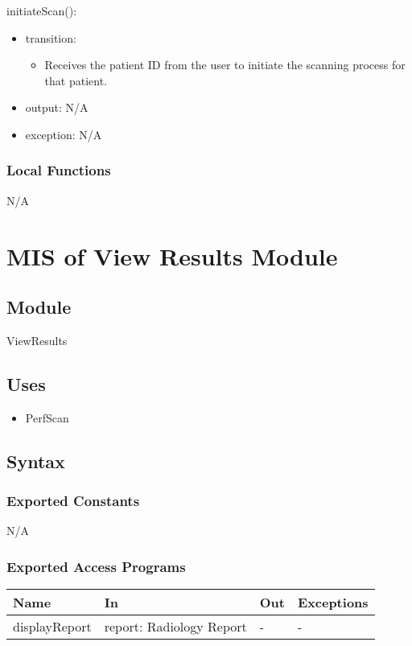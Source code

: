 \documentclass[12pt, titlepage]{article}
\begin{document}
\noindent initiateScan():
\begin{itemize}
\item transition: \begin{itemize}
    \item Receives the patient ID from the user to initiate the scanning process for that patient.
\end{itemize}
\item output: N/A 
\item exception: N/A
\end{itemize}

\subsubsection{Local Functions}
N/A
\newpage

\section{MIS of View Results Module} \label{Module} 
\subsection{Module}
ViewResults
\subsection{Uses}
\begin{itemize}
    \item PerfScan
\end{itemize}
\subsection{Syntax}

\subsubsection{Exported Constants}
N/A
\subsubsection{Exported Access Programs}

\begin{center}
\begin{tabular}{p{3cm} p{5cm} p{2cm} p{2cm}}
\hline
\textbf{Name} & \textbf{In} & \textbf{Out} & \textbf{Exceptions} \\
\hline
displayReport & report: Radiology Report & - & - \\
\hline
\end{tabular}
\end{center}
\end{document}
